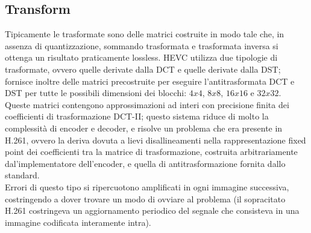 \subsection{Transform}
Tipicamente le trasformate sono delle matrici costruite in modo tale che, in 
assenza di quantizzazione, sommando trasformata e trasformata inversa si 
ottenga un risultato praticamente lossless.
HEVC utilizza due tipologie di trasformate, ovvero quelle derivate dalla DCT e
quelle derivate dalla DST; fornisce inoltre delle matrici precostruite per 
eseguire l'antitrasformata DCT e DST per tutte le possibili dimensioni dei 
blocchi: $4x4$, $8x8$, $16x16$ e $32x32$.
Queste matrici contengono approssimazioni ad interi con precisione finita dei 
coefficienti di trasformazione DCT-II; questo sistema riduce di molto la 
complessità di encoder e decoder, e risolve un problema che era presente in 
H.261, ovvero la deriva dovuta a lievi disallineamenti nella rappresentazione 
fixed point dei coefficienti tra la matrice di trasformazione, costruita 
arbitrariamente dal'implementatore dell'encoder, e quella di antitrasformazione 
fornita dallo standard. \\
Errori di questo tipo si ripercuotono amplificati in ogni immagine successiva, 
costringendo a dover trovare un modo di ovviare al problema (il sopracitato 
H.261 costringeva un aggiornamento periodico del segnale che consisteva in una 
immagine codificata interamente intra).
